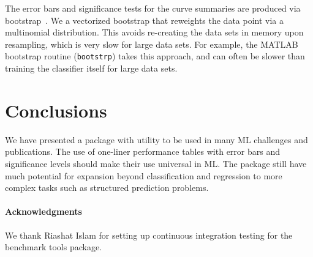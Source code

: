 \documentclass{article}
\newcommand{\code}{\texttt}
\begin{document}
The error bars and significance tests for the curve summaries are produced via bootstrap~\citep{Efron1994}.
We a vectorized bootstrap that reweights the data point via a multinomial distribution.
This avoids re-creating the data sets in memory upon resampling, which is very slow for large data sets.
For example, the MATLAB bootstrap routine (\code{bootstrp}) takes this approach, and can often be slower than training the classifier itself for large data sets. 

\section{Conclusions}

We have presented a package with utility to be used in many ML challenges and publications.
The use of one-liner performance tables with error bars and significance levels should make their use universal in ML\@.
The package still have much potential for expansion beyond classification and regression to more complex tasks such as structured prediction problems.

\paragraph{Acknowledgments}
We thank Riashat Islam for setting up continuous integration testing for the benchmark tools package.


\end{document}
